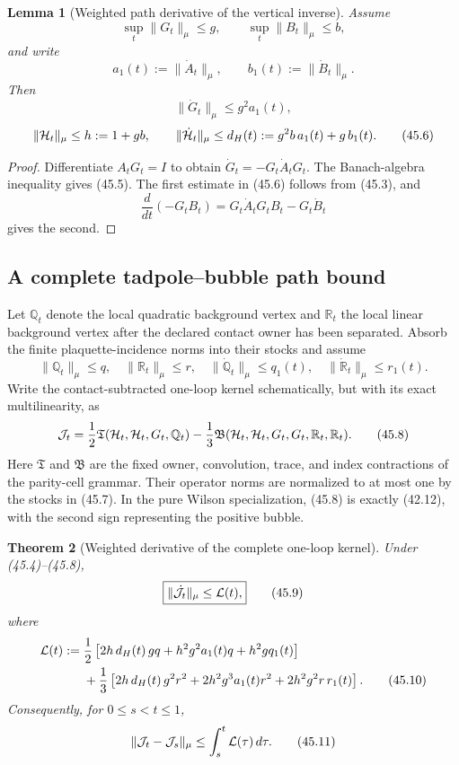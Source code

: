 \documentclass[11pt,oneside]{book}
\newtheorem{theorem}{Theorem}[chapter]
\newtheorem{lemma}[theorem]{Lemma}
\theoremstyle{definition}
\theoremstyle{remark}
\begin{document}
\begin{lemma}[Weighted path derivative of the vertical inverse]
\label{lem:e8v45-inverse-path}
Assume
\[
 \sup_t\|G_t\|_\mu\le g,\qquad
 \sup_t\|B_t\|_\mu\le b,                                       \tag{45.4}
\]
and write
\[
 a_1(t):=\|\dot A_t\|_\mu,\qquad
 b_1(t):=\|\dot B_t\|_\mu.
\]
Then
\[
 \|\dot G_t\|_\mu\le g^2a_1(t),                                \tag{45.5}
\]
\[
 \|{\cal H}_t\|_\mu\le h:=1+gb,\qquad
 \|\dot{\cal H}_t\|_\mu
 \le d_H(t):=g^2b\,a_1(t)+g\,b_1(t).                           \tag{45.6}
\]
\end{lemma}

\begin{proof}
Differentiate \(A_tG_t=I\) to obtain
\(\dot G_t=-G_t\dot A_tG_t\).  The Banach-algebra inequality gives
(45.5).  The first estimate in (45.6) follows from (45.3), and
\[
 \frac d{dt}(-G_tB_t)
 =G_t\dot A_tG_tB_t-G_t\dot B_t
\]
gives the second.
\end{proof}

\subsection{A complete tadpole--bubble path bound}

Let \({\mathbb Q}_t\) denote the local quadratic background vertex
and \({\mathbb R}_t\) the local linear background vertex after the
declared contact owner has been separated.  Absorb the finite
plaquette-incidence norms into their stocks and assume
\[
 \|{\mathbb Q}_t\|_\mu\le q,\quad
 \|{\mathbb R}_t\|_\mu\le r,\quad
 \|\dot{\mathbb Q}_t\|_\mu\le q_1(t),\quad
 \|\dot{\mathbb R}_t\|_\mu\le r_1(t).                           \tag{45.7}
\]
Write the contact-subtracted one-loop kernel schematically, but
with its exact multilinearity, as
\[
 {\cal J}_t
 =\frac12{\mathfrak T}({\cal H}_t,{\cal H}_t,G_t,{\mathbb Q}_t)
 -\frac13{\mathfrak B}({\cal H}_t,{\cal H}_t,
 G_t,G_t,{\mathbb R}_t,{\mathbb R}_t).                          \tag{45.8}
\]
Here \(\mathfrak T\) and \(\mathfrak B\) are the fixed owner,
convolution, trace, and index contractions of the parity-cell
grammar.  Their operator norms are normalized to at most one by the
stocks in (45.7).  In the pure Wilson specialization, (45.8) is
exactly (42.12), with the second sign representing the positive
bubble.

\begin{theorem}[Weighted derivative of the complete one-loop kernel]
\label{thm:e8v45-loop-path}
Under (45.4)--(45.8),
\[
 \boxed{\|\dot{\cal J}_t\|_\mu\le{\cal L}(t),}                  \tag{45.9}
\]
where
\[
 \begin{split}
 {\cal L}(t):={}&
 \frac12\left[
 2h\,d_H(t)\,gq+h^2g^2a_1(t)q+h^2gq_1(t)\right]\\
 &+\frac13\left[
 2h\,d_H(t)\,g^2r^2
 +2h^2g^3a_1(t)r^2
 +2h^2g^2r\,r_1(t)\right].
                                                                    \tag{45.10}
 \end{split}
\]
Consequently, for \(0\le s<t\le1\),
\[
 \|{\cal J}_t-{\cal J}_s\|_\mu
 \le\int_s^t{\cal L}(\tau)\,d\tau.                             \tag{45.11}
\]
\end{theorem}
\end{document}
